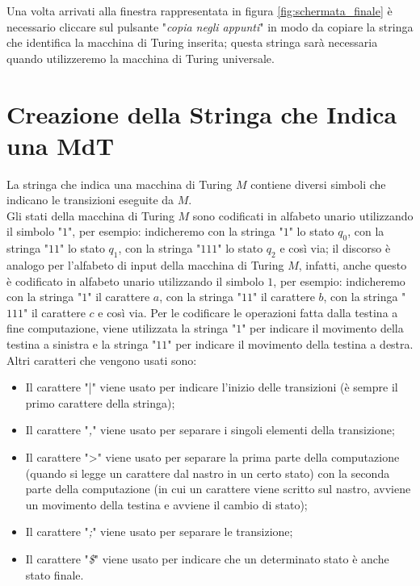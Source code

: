 \documentclass[a4paper,12pt,titlepage,oneside]{book}
\begin{document}
Una volta arrivati alla finestra rappresentata in figura \ref{fig:schermata_finale} è necessario cliccare sul pulsante "\emph{copia negli appunti}" in modo da copiare la stringa che identifica la macchina di Turing inserita; questa stringa sarà necessaria quando utilizzeremo la macchina di Turing universale.

		\section{Creazione della Stringa che Indica una MdT}

La stringa che indica una macchina di Turing $M$ contiene diversi simboli che indicano le transizioni eseguite da $M$.\\
Gli stati della macchina di Turing $M$ sono codificati in alfabeto unario utilizzando il simbolo "$1$", per esempio: indicheremo con la stringa "$1$" lo stato $q_0$, con la stringa "$11$" lo stato $q_1$, con la stringa "$111$" lo stato $q_2$ e così via; il discorso è analogo per l'alfabeto di input della macchina di Turing $M$, infatti, anche questo è codificato in alfabeto unario utilizzando il simbolo $1$, per esempio: indicheremo con la stringa "$1$" il carattere $a$, con la stringa "$11$" il carattere $b$, con la stringa "$111$" il carattere $c$ e così via.
Per le codificare le operazioni fatta dalla testina a fine computazione, viene utilizzata la stringa "$1$" per indicare il movimento della testina a sinistra e la stringa "$11$" per indicare il movimento della testina a destra.
Altri caratteri che vengono usati sono:

\begin{itemize}
	\item Il carattere "|" viene usato per indicare l'inizio delle transizioni (è sempre il primo carattere della stringa);
	\item Il carattere "\emph{,}" viene usato per separare i singoli elementi della transizione;
	\item Il carattere ">" viene usato per separare la prima parte della computazione (quando si legge un carattere dal nastro in un certo stato) con la seconda parte della computazione (in cui un carattere viene scritto sul nastro, avviene un movimento della testina e avviene il cambio di stato);
	\item Il carattere "\emph{;}" viene usato per separare le transizione;
	\item Il carattere "\emph{\$}" viene usato per indicare che un determinato stato è anche stato finale.
\end{itemize}
\end{document}
